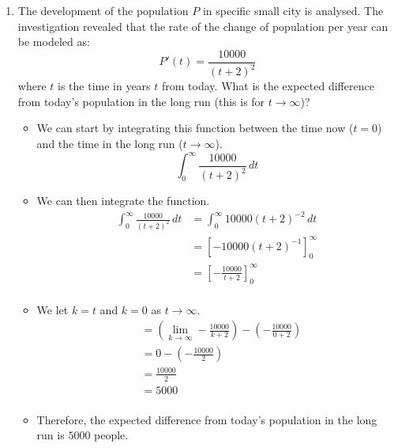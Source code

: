 \documentclass[12pt]{article}
\begin{document}
\begin{enumerate}[leftmargin=\labelsep]
    \item The development of the population $P$ in specific small city is analysed. The investigation
    revealed that the rate of the change of population per year can be modeled as:
    \begingroup
    \large
    \begin{equation*}
        P'(t) = \frac{10000}{(t+2)^2}
    \end{equation*}
    \endgroup
    where $t$ is the time in years $t$ from today. What is the expected difference from today's population
    in the long run (this is for $t \to \infty$)?
    \begin{itemize}[label={}]
        \item We can start by integrating this function between the time now ($t=0$) and the time in the long run ($t \to \infty$).
        \begin{equation*}
            \int_{0}^{\infty} \frac{10000}{(t+2)^2} \, dt
        \end{equation*}
        \item We can then integrate the function.
        \begin{equation*}
            \begin{aligned}
                \int_{0}^{\infty} \frac{10000}{(t+2)^2} \, dt &= \int_{0}^{\infty} 10000(t+2)^{-2} \, dt \\
                &= \left[ -10000(t+2)^{-1} \right]_{0}^{\infty} \\
                &= \left[ -\frac{10000}{t+2} \right]_{0}^{\infty} \\
            \end{aligned}
        \end{equation*}
        \item We let $k=t$ and $k=0$ as $t \to \infty$.
        \begin{equation*}
            \begin{aligned}
                &= \left(\lim_{k \to \infty}  -\frac{10000}{k+2} \right) - \left( -\frac{10000}{0+2} \right) \\
                &= 0 - \left( -\frac{10000}{2} \right) \\
                &= \frac{10000}{2} \\
                &= 5000 \\
            \end{aligned}
        \end{equation*}
        \item Therefore, the expected difference from today's population in the long run is $5000$ people.
    \end{itemize}


\end{enumerate}
\end{document}
